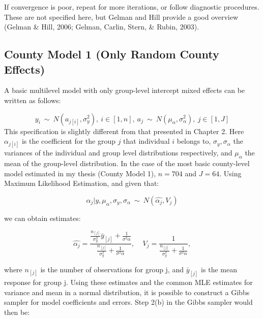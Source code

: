 \documentclass[12pt,twoside]{reedthesis}
\begin{document}
  If convergence is poor, repeat for more iterations, or follow diagnostic
  procedures. These are not specified here, but Gelman and Hill provide a
  good overview (Gelman \& Hill, 2006; Gelman, Carlin, Stern, \& Rubin,
  2003).
  
  \subsection{County Model 1 (Only Random County
  Effects)}\label{county-model-1-only-random-county-effects}
  
  A basic multilevel model with only group-level intercept mixed effects
  can be written as follows:
  
  \[y_i \ \sim \ N(a_{j[i]}, \sigma^2_y),\ i \in [1, n],\ a_j \ \sim \ N(\mu_{\alpha}, \sigma^2_{\alpha}), \ j \in [1,J]\]
  This specification is slightly different from that presented in Chapter
  2. Here \(\alpha_{j[i]}\) is the coefficient for the group \(j\) that
  individual \(i\) belongs to, \(\sigma_y, \sigma_{\alpha}\) the variances
  of the individual and group level distributions respectively, and
  \(\mu_{\alpha}\) the mean of the group-level distribution. In the case
  of the most basic county-level model estimated in my thesis (County
  Model 1), \(n = 704\) and \(J = 64\). Using Maximum Likelihood
  Estimation, and given that:
  
  \begin{equation}
    \alpha_j|y, \mu_{\alpha}, \sigma_y, \sigma_{\alpha} \ \sim \ N(\hat{\alpha_j}, V_j)
  \end{equation}
  
  we can obtain estimates:
  
  \begin{equation}
  \hat{\alpha_j} = \frac{\frac{n_{[j]}}{\sigma^2_y}\bar{y}_{[j]} + \frac{1}{\sigma^2{\alpha}}}{\frac{n_{[j]}}{\sigma^2_y} + \frac{1}{\sigma^2{\alpha}}},\ \ \ \ \  V_j = \frac{1}{\frac{n_{[j]}}{\sigma^2_y} + \frac{1}{\sigma^2{\alpha}}},
  \end{equation}
  
  where \(n_{[j]}\) is the number of observations for group j, and
  \(\bar{y}_{[j]}\) is the mean response for group j. Using these
  estimates and the common MLE estimates for variance and mean in a normal
  distribution, it is possible to construct a Gibbs sampler for model
  coefficients and errors. Step 2(b) in the Gibbs sampler would then be:
  
\end{document}
